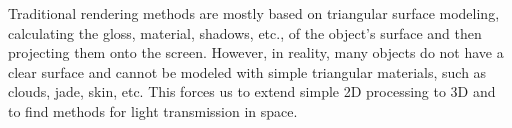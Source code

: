 Traditional rendering methods are mostly based on triangular surface modeling, calculating the gloss, material, shadows, etc., of the object's surface and then projecting them onto the screen. However, in reality, many objects do not have a clear surface and cannot be modeled with simple triangular materials, such as clouds, jade, skin, etc. This forces us to extend simple 2D processing to 3D and to find methods for light transmission in space.